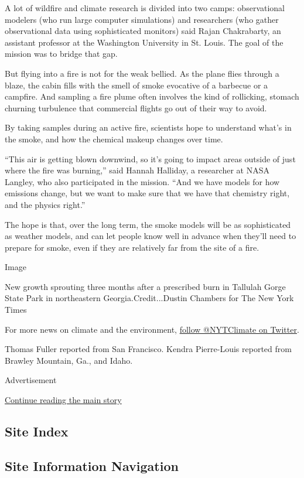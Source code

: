 A lot of wildfire and climate research is divided into two camps:
observational modelers (who run large computer simulations) and
researchers (who gather observational data using sophisticated monitors)
said Rajan Chakrabarty, an assistant professor at the Washington
University in St. Louis. The goal of the mission was to bridge that gap.

But flying into a fire is not for the weak bellied. As the plane flies
through a blaze, the cabin fills with the smell of smoke evocative of a
barbecue or a campfire. And sampling a fire plume often involves the
kind of rollicking, stomach churning turbulence that commercial flights
go out of their way to avoid.

By taking samples during an active fire, scientists hope to understand
what's in the smoke, and how the chemical makeup changes over time.

``This air is getting blown downwind, so it's going to impact areas
outside of just where the fire was burning,'' said Hannah Halliday, a
researcher at NASA Langley, who also participated in the mission. ``And
we have models for how emissions change, but we want to make sure that
we have that chemistry right, and the physics right.''

The hope is that, over the long term, the smoke models will be as
sophisticated as weather models, and can let people know well in advance
when they'll need to prepare for smoke, even if they are relatively far
from the site of a fire.

Image

New growth sprouting three months after a prescribed burn in Tallulah
Gorge State Park in northeastern Georgia.Credit...Dustin Chambers for
The New York Times

For more news on climate and the environment,
\href{https://twitter.com/nytclimate}{follow @NYTClimate on Twitter}.

Thomas Fuller reported from San Francisco. Kendra Pierre-Louis reported
from Brawley Mountain, Ga., and Idaho.

Advertisement

\protect\hyperlink{after-bottom}{Continue reading the main story}

\hypertarget{site-index}{%
\subsection{Site Index}\label{site-index}}

\hypertarget{site-information-navigation}{%
\subsection{Site Information
Navigation}\label{site-information-navigation}}

